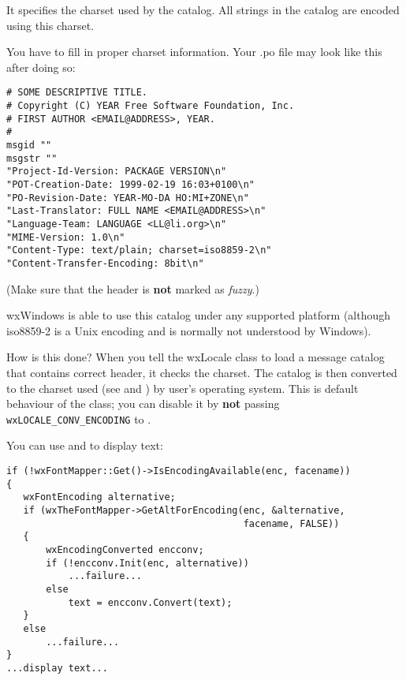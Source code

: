 It specifies the charset used by the catalog. All strings in the catalog
are encoded using this charset.

You have to fill in proper charset information. Your .po file may look like this
after doing so: 

\begin{verbatim}
# SOME DESCRIPTIVE TITLE.
# Copyright (C) YEAR Free Software Foundation, Inc.
# FIRST AUTHOR <EMAIL@ADDRESS>, YEAR.
#
msgid ""
msgstr ""
"Project-Id-Version: PACKAGE VERSION\n"
"POT-Creation-Date: 1999-02-19 16:03+0100\n"
"PO-Revision-Date: YEAR-MO-DA HO:MI+ZONE\n"
"Last-Translator: FULL NAME <EMAIL@ADDRESS>\n"
"Language-Team: LANGUAGE <LL@li.org>\n"
"MIME-Version: 1.0\n"
"Content-Type: text/plain; charset=iso8859-2\n"
"Content-Transfer-Encoding: 8bit\n"
\end{verbatim}

(Make sure that the header is {\bf not} marked as {\it fuzzy}.)

wxWindows is able to use this catalog under any supported platform
(although iso8859-2 is a Unix encoding and is normally not understood by
Windows).

How is this done? When you tell the wxLocale class to load a message catalog that
contains correct header, it checks the charset. The catalog is then converted
to the charset used (see
 and
) by
user's operating system. This is default behaviour of the
 class; you can disable it by {\bf not} passing
{\tt wxLOCALE\_CONV\_ENCODING} to .


You can use  and 
 to display text:

\begin{verbatim}
if (!wxFontMapper::Get()->IsEncodingAvailable(enc, facename))
{
   wxFontEncoding alternative;
   if (wxTheFontMapper->GetAltForEncoding(enc, &alternative, 
                                          facename, FALSE))
   {
       wxEncodingConverted encconv;
       if (!encconv.Init(enc, alternative))
           ...failure...
       else
           text = encconv.Convert(text);
   }
   else
       ...failure...
}
...display text...
\end{verbatim}


